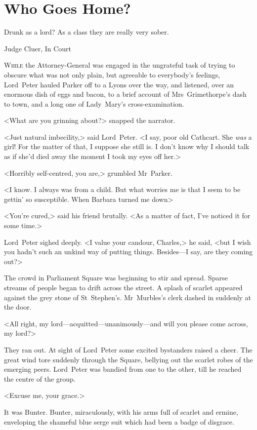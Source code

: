 
\chapter{Who Goes Home?}

\epigraph{Drunk as a lord? As a class they are really very sober.}{Judge Cluer, In Court}


\lettrine{W}{hile} the Attorney-General was engaged in the ungrateful task of trying to obscure what was not only plain, but agreeable to everybody's feelings, Lord~Peter hauled Parker off to a Lyons over the way, and listened, over an enormous dish of eggs and bacon, to a brief account of Mrs~Grimethorpe's dash to town, and a long one of Lady~Mary's cross-examination.

<What are you grinning about?> snapped the narrator.

<Just natural imbecility,> said Lord~Peter. <I say, poor old Cathcart.  She \emph{was} a girl! For the matter of that, I suppose she still is. I don't know why I should talk as if she'd died away the moment I took my eyes off her.>

<Horribly self-centred, you are,> grumbled Mr~Parker.

<I know. I always was from a child. But what worries me is that I seem to be gettin' so susceptible. When Barbara turned me down\longdash>

<You're cured,> said his friend brutally. <As a matter of fact, I've noticed it for some time.>

Lord~Peter sighed deeply. <I value your candour, Charles,> he said, <but I wish you hadn't such an unkind way of putting things. Besides—I say, are they coming out?>

The crowd in Parliament Square was beginning to stir and spread. Sparse streams of people began to drift across the street. A splash of scarlet appeared against the grey stone of St~Stephen's. Mr~Murbles's clerk dashed in suddenly at the door.

<All right, my lord—acquitted—unanimously—and will you please come across, my lord?>

They ran out. At sight of Lord~Peter some excited bystanders raised a cheer. The great wind tore suddenly through the Square, bellying out the scarlet robes of the emerging peers. Lord~Peter was bandied from one to the other, till he reached the centre of the group.

<Excuse me, your grace.>

It was Bunter. Bunter, miraculously, with his arms full of scarlet and ermine, enveloping the shameful blue serge suit which had been a badge of disgrace.

